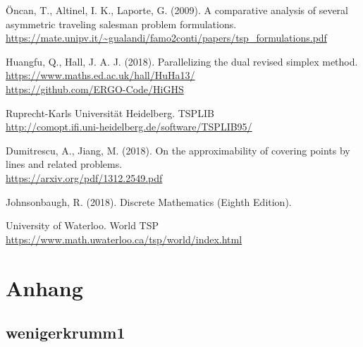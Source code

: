 \documentclass[a4paper, 10pt, ngerman]{article}
\begin{document}
\inputminted{c++}{aufgabe1/aufgabe1_randomized.cpp}

\begin{thebibliography}{4}
    Öncan, T., Altinel, I. K., Laporte, G. (2009).
    A comparative analysis of several asymmetric traveling salesman problem formulations. \\
    \href{https://mate.unipv.it/gualandi/famo2conti/papers/tsp_formulations.pdf}{https://mate.unipv.it/\textasciitilde{}gualandi/famo2conti/papers/tsp\_formulations.pdf}
    
    Huangfu, Q., Hall, J. A. J. (2018).
    Parallelizing the dual revised simplex method. \\
    \href{https://www.maths.ed.ac.uk/hall/HuHa13/}{https://www.maths.ed.ac.uk/hall/HuHa13/} \\
    \href{https://github.com/ERGO-Code/HiGHS}{https://github.com/ERGO-Code/HiGHS}

    Ruprecht-Karls Universität Heidelberg. TSPLIB \\
    \href{http://comopt.ifi.uni-heidelberg.de/software/TSPLIB95/}{http://comopt.ifi.uni-heidelberg.de/software/TSPLIB95/}

    Dumitrescu, A., Jiang, M. (2018).
    On the approximability of covering points by lines and related problems. \\
    \href{https://arxiv.org/pdf/1312.2549.pdf}{https://arxiv.org/pdf/1312.2549.pdf}

    Johnsonbaugh, R. (2018). 
    Discrete Mathematics (Eighth Edition).

    University of Waterloo. World TSP \\
    \href{https://www.math.uwaterloo.ca/tsp/world/index.html}{https://www.math.uwaterloo.ca/tsp/world/index.html}
\end{thebibliography}

\section*{Anhang}

\subsection*{wenigerkrumm1}
\end{document}
